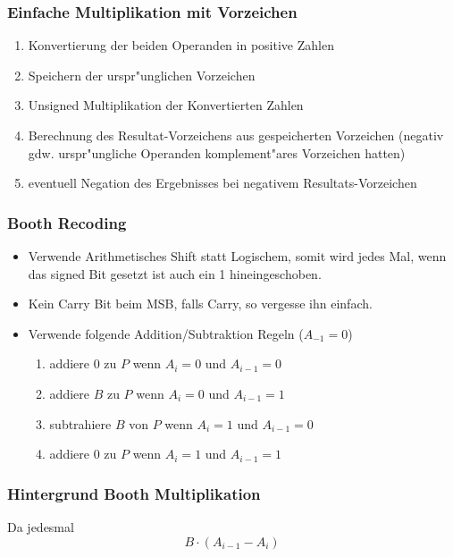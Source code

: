 \documentclass[german, 10pt, a4paper, twocolumn]{scrartcl}
\theoremstyle{definition}
\begin{document}
\subsubsection{Einfache Multiplikation mit Vorzeichen}

\begin{enumerate}
	\item Konvertierung der beiden Operanden in positive Zahlen
	\item Speichern der urspr"unglichen Vorzeichen
	\item Unsigned Multiplikation der Konvertierten Zahlen
	\item Berechnung des Resultat-Vorzeichens aus gespeicherten Vorzeichen (negativ gdw. urspr"ungliche Operanden komplement"ares Vorzeichen hatten)
	\item eventuell Negation des Ergebnisses bei negativem Resultats-Vorzeichen
\end{enumerate}

\subsubsection{Booth Recoding}

\begin{itemize}
	\item Verwende Arithmetisches Shift statt Logischem, somit wird jedes Mal, wenn das signed Bit gesetzt ist auch ein 1 hineingeschoben.
	\item Kein Carry Bit beim MSB, falls Carry, so vergesse ihn einfach.
	\item Verwende folgende Addition/Subtraktion Regeln ($A_{-1}=0$)
		\begin{enumerate}
			\item addiere 0 zu $P$ wenn $A_{i}=0$ und $A_{i-1}=0$
			\item addiere $B$ zu $P$ wenn $A_{i}=0$ und $A_{i-1}=1$
			\item subtrahiere $B$ von $P$ wenn $A_{i}=1$ und $A_{i-1}=0$
			\item addiere 0 zu $P$ wenn $A_{i}=1$ und $A_{i-1}=1$
		\end{enumerate}
\end{itemize}

\subsubsection{Hintergrund Booth Multiplikation}

Da jedesmal
\begin{displaymath}
	B \cdotp (A_{i-1} - A_{i})
\end{displaymath}
\end{document}
